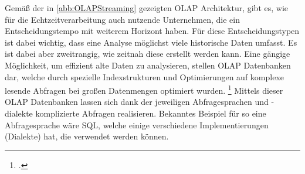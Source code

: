 Gemäß der in \autoref{abb:OLAPStreaming} gezeigten \ac{OLAP} Architektur, gibt es, wie für die Echtzeitverarbeitung auch nutzende Unternehmen, die ein Entscheidungstempo mit weiterem Horizont haben. Für diese Entscheidungstypen ist dabei wichtig, dass eine Analyse möglichst viele historische Daten umfasst. Es ist dabei aber zweitrangig, wie zeitnah diese erstellt werden kann. 
Eine gängige Möglichkeit, um effizient alte Daten zu analysieren, stellen \ac{OLAP} Datenbanken dar, welche durch spezielle Indexstrukturen und Optimierungen auf komplexe lesende Abfragen bei großen Datenmengen optimiert wurden. \footcite[Vgl.][5\psq]{Codd.1993} Mittels dieser \ac{OLAP} Datenbanken lassen sich dank der jeweiligen Abfragesprachen und -dialekte komplizierte Abfragen realisieren. Bekanntes Beispiel für so eine Abfragesprache wäre \ac{SQL}, welche einige verschiedene Implementierungen (Dialekte) hat, die verwendet werden können. 